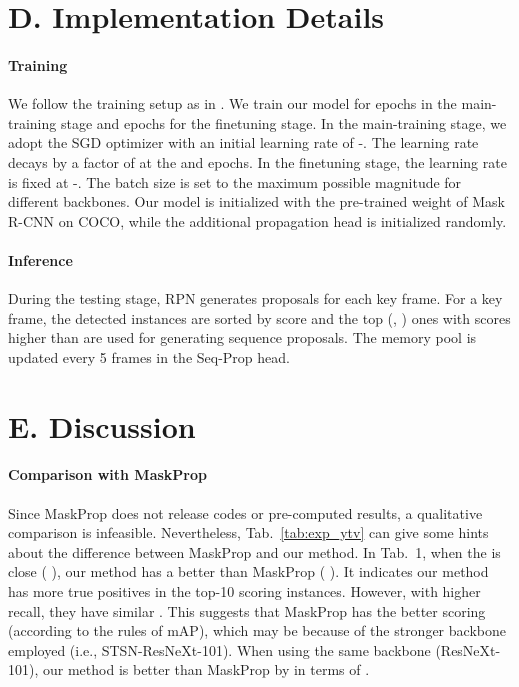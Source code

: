\documentclass[10pt,twocolumn,letterpaper]{article}
\begin{document}
	\vspace{-0.05in}
	\section*{D. Implementation Details} \label{sec:implement}
	\paragraph{Training} We follow the training setup as in \cite{he2017mask}. We train our model for  epochs in the main-training stage and  epochs for the finetuning stage. In the main-training stage, we adopt the SGD optimizer with an initial learning rate of -. The learning rate decays by a factor of  at the  and  epochs. In the finetuning stage, the learning rate is fixed at -. The batch size is set to the maximum possible magnitude for different backbones. Our model is initialized with the pre-trained weight of Mask R-CNN \cite{he2017mask} on COCO, while the additional propagation head is initialized randomly.
	
	\vspace{-0.2in}
	\paragraph{Inference} During the testing stage, RPN generates  proposals for each key frame. For a key frame, the detected instances are sorted by score and the top  (\ie, ) ones with scores higher than  are used for generating sequence proposals. 
	The memory pool is updated every 5 frames in the Seq-Prop head.
	
	\section*{E. Discussion} \label{sec:discuss}
	\paragraph{Comparison with MaskProp} 
	Since MaskProp \cite{bertasius2020maskprop} does not release codes or pre-computed results, a qualitative comparison is infeasible.
	Nevertheless, Tab.~\ref{tab:exp_ytv} can give some hints about the difference between MaskProp and our method. In Tab.~1, when the  is close (  ), our method has a better  than MaskProp (  ). It indicates our method has more true positives in the top-10 scoring instances. However, with higher recall, they have similar . This suggests that MaskProp has the better scoring (according to the rules of mAP), which may be because of the stronger backbone employed (i.e., STSN-ResNeXt-101). When using the same backbone (ResNeXt-101), our method is better than MaskProp by  in terms of .
\end{document}
